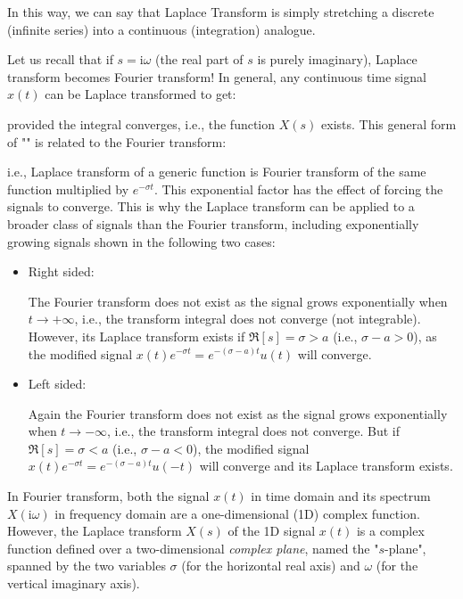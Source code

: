	In this way, we can say that Laplace Transform is simply stretching a discrete (infinite series)  into a continuous (integration) analogue. 
	
	Let us recall that if $s=\mathrm{i}\omega$ (the real part of $s$ is purely imaginary), Laplace transform becomes Fourier transform! In general, any continuous time signal $x(t)$ can be Laplace transformed to get:
	
	provided the integral converges, i.e., the function $X(s)$ exists. This general form of "\label{bilateral Laplace transform}" is related to the Fourier transform:
	
	i.e., Laplace transform of a generic function is Fourier transform of the same function multiplied by $e^{-\sigma t}$. This exponential factor has the effect of forcing the signals to converge. This is why the Laplace transform can be applied to a broader class of signals than the Fourier transform, including exponentially growing signals shown in the following two cases:

	\begin{itemize}
		\item Right sided:
		
		The Fourier transform does not exist as the signal grows exponentially when $t\rightarrow +\infty$, i.e., the transform integral does not converge (not integrable). However, its Laplace transform exists if $\Re[s]=\sigma>a$ (i.e., $\sigma-a>0$), as the modified signal $x(t)e^{-\sigma t}=e^{-(\sigma-a)t}u(t)$ will converge.
		
		\item Left sided:
		 
		Again the Fourier transform does not exist as the signal grows exponentially when $t\rightarrow -\infty$, i.e., the transform integral does not converge. But if $\Re[s]=\sigma<a$ (i.e., $\sigma-a<0$), the modified signal $x(t)e^{-\sigma t}=e^{-(\sigma-a)t}u(-t)$ will converge and its Laplace transform exists.
	\end{itemize}

	In Fourier transform, both the signal $x(t)$ in time domain and its spectrum $X(\mathrm{i}\omega)$ in frequency domain are a one-dimensional (1D) complex function. However, the Laplace transform $X(s)$ of the 1D signal $x(t)$ is a complex function defined over a two-dimensional {\em complex plane}, named the "$s$-plane",	spanned by the two variables $\sigma$ (for the horizontal real axis) and $\omega$ (for the vertical imaginary axis). 
	

